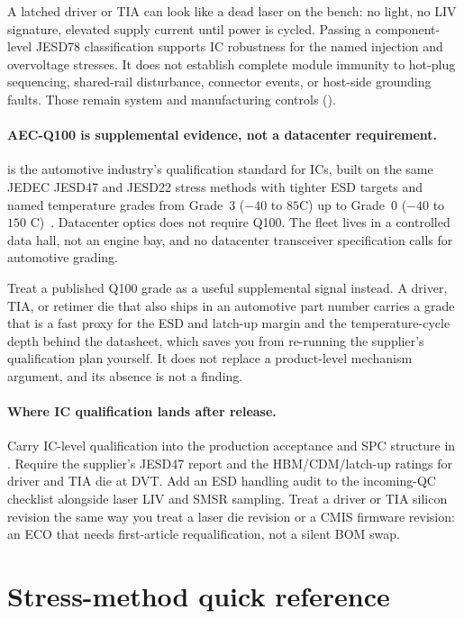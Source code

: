 A latched driver or TIA can look like a dead laser on the bench: no light, no
LIV signature, elevated supply current until power is cycled. Passing a
component-level JESD78 classification supports IC robustness for the named
injection and overvoltage stresses. It does not establish complete module
immunity to hot-plug sequencing, shared-rail disturbance, connector events, or
host-side grounding faults. Those remain system and manufacturing controls
().

\paragraph{AEC-Q100 is supplemental evidence, not a datacenter requirement.}
 is the automotive industry's qualification
standard for ICs, built on the same JEDEC JESD47 and JESD22 stress methods with
tighter ESD targets and named temperature grades from Grade~3 ($-40$ to
$85$\textdegree C) up to Grade~0 ($-40$ to $150$\textdegree
C)~. Datacenter optics does not require Q100. The fleet
lives in a controlled data hall, not an engine bay, and no datacenter
transceiver specification calls for automotive grading.

Treat a published Q100 grade as a useful supplemental signal instead. A driver,
TIA, or retimer die that also ships in an automotive part number carries a
grade that is a fast proxy for the ESD and latch-up margin and the
temperature-cycle depth behind the datasheet, which saves you from re-running
the supplier's qualification plan yourself. It does not replace a product-level
mechanism argument, and its absence is not a finding.

\paragraph{Where IC qualification lands after release.}
Carry IC-level qualification into the production acceptance and SPC structure
in . Require the supplier's JESD47 report and the
HBM/CDM/latch-up ratings for driver and TIA die at DVT. Add an ESD handling
audit to the incoming-QC checklist alongside laser LIV and SMSR sampling. Treat
a driver or TIA silicon revision the same way you treat a laser die revision or
a CMIS firmware revision: an ECO that needs first-article requalification, not
a silent BOM swap.

\section{Stress-method quick reference}
\label{sec:stress-method-reference}

